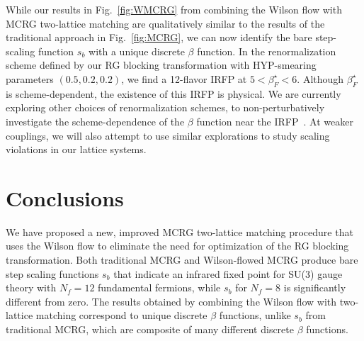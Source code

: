 \documentclass{PoS}
\newcommand{\be}{\ensuremath{\beta} }
\newcommand{\fig}[1]{Fig.~\ref{#1}}
\begin{document}
While our results in \fig{fig:WMCRG} from combining the Wilson flow with MCRG two-lattice matching are qualitatively similar to the results of the traditional approach in \fig{fig:MCRG}, we can now identify the bare step-scaling function $s_b$ with a unique discrete \be function.
In the renormalization scheme defined by our RG blocking transformation with HYP-smearing parameters $(0.5, 0.2, 0.2)$, we find a 12-flavor IRFP at $5 < \be_F^{\star} < 6$.
Although $\be_F^{\star}$ is scheme-dependent, the existence of this IRFP is physical.
We are currently exploring other choices of renormalization schemes, to non-perturbatively investigate the scheme-dependence of the \be function near the IRFP~\cite{Ryttov:2012nt}.
At weaker couplings, we will also attempt to use similar explorations to study scaling violations in our lattice systems.



\section{Conclusions} %
We have proposed a new, improved MCRG two-lattice matching procedure that uses the Wilson flow to eliminate the need for optimization of the RG blocking transformation.
Both traditional MCRG and Wilson-flowed MCRG produce bare step scaling functions $s_b$ that indicate an infrared fixed point for SU(3) gauge theory with $N_f = 12$ fundamental fermions, while $s_b$ for $N_f = 8$ is significantly different from zero.
The results obtained by combining the Wilson flow with two-lattice matching correspond to unique discrete \be functions, unlike $s_b$ from traditional MCRG, which are composite of many different discrete \be functions.





\end{document}
